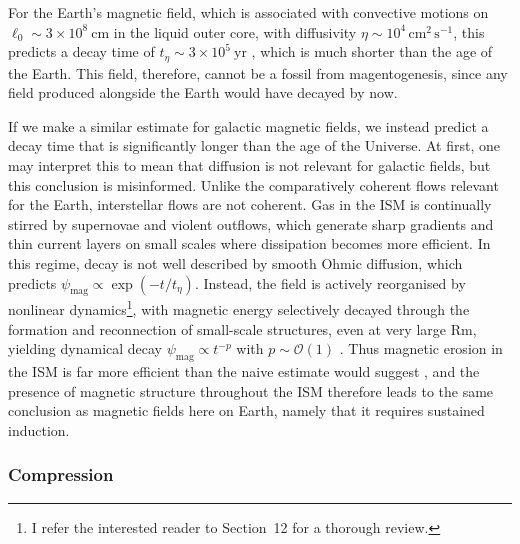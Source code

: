 \documentclass[12pt,twoside]{extreport}
\newcommand{\mRem}{\ensuremath{\mathrm{Rm}}} %
\newcommand{\eg}{e.g.,\xspace} %
\begin{document}
For the Earth's magnetic field, which is associated with convective motions on $\ell_0 \sim 3\times 10^8~\mathrm{cm}$ in the liquid outer core, with diffusivity $\eta \sim 10^4 \,\mathrm{cm}^2 \,\mathrm{s}^{-1}$, this predicts a decay time of $t_\eta \sim 3 \times 10^5~\mathrm{yr}$ \citep{choudhuri1998physics}, which is much shorter than the age of the Earth. This field, therefore, cannot be a fossil from magentogenesis, since any field produced alongside the Earth would have decayed by now.

If we make a similar estimate for galactic magnetic fields, we instead predict a decay time that is significantly longer than the age of the Universe. At first, one may interpret this to mean that diffusion is not relevant for galactic fields, but this conclusion is misinformed. Unlike the comparatively coherent flows relevant for the Earth, interstellar flows are not coherent. Gas in the ISM is continually stirred by supernovae and violent outflows, which generate sharp gradients and thin current layers on small scales where dissipation becomes more efficient. In this regime, decay is not well described by smooth Ohmic diffusion, which predicts $\psi_\mathrm{mag} \propto \exp(-t/t_\eta)$. Instead, the field is actively reorganised by nonlinear dynamics\footnote{
    I refer the interested reader to \citet{schekochihin2022mhd} Section~12 for a thorough review.
}, with magnetic energy selectively decayed through the formation and reconnection of small-scale structures, even at very large $\mRem$, yielding dynamical decay $\psi_\mathrm{mag} \propto t^{-p}$ with $p \sim \mathcal{O}(1)$ \citep[see \eg][]{hosking2021reconnection}. Thus magnetic erosion in the ISM is far more efficient than the naive estimate would suggest \citep{brandenburg2025turbulent}, and the presence of magnetic structure throughout the ISM therefore leads to the same conclusion as magnetic fields here on Earth, namely that it requires sustained induction.

\subsubsection{Compression}
\label{sec:evolve:compression}
\end{document}
